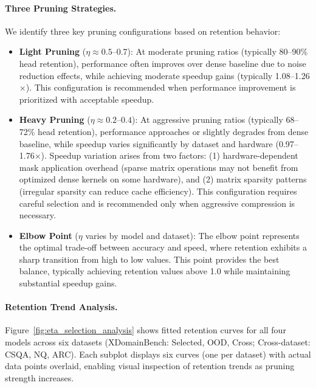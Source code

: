 \paragraph{Three Pruning Strategies.}
We identify three key pruning configurations based on retention behavior:

\begin{itemize}
    \item \textbf{Light Pruning} ($\eta \approx 0.5$--$0.7$): At moderate pruning ratios (typically 80--90\% head retention), performance often improves over dense baseline due to noise reduction effects, while achieving moderate speedup gains (typically 1.08--1.26$\times$). This configuration is recommended when performance improvement is prioritized with acceptable speedup.
    
    \item \textbf{Heavy Pruning} ($\eta \approx 0.2$--$0.4$): At aggressive pruning ratios (typically 68--72\% head retention), performance approaches or slightly degrades from dense baseline, while speedup varies significantly by dataset and hardware (0.97--1.76$\times$). Speedup variation arises from two factors: (1) hardware-dependent mask application overhead (sparse matrix operations may not benefit from optimized dense kernels on some hardware), and (2) matrix sparsity patterns (irregular sparsity can reduce cache efficiency). This configuration requires careful selection and is recommended only when aggressive compression is necessary.
    
    \item \textbf{Elbow Point} ($\eta$ varies by model and dataset): The elbow point represents the optimal trade-off between accuracy and speed, where retention exhibits a sharp transition from high to low values. This point provides the best balance, typically achieving retention values above 1.0 while maintaining substantial speedup gains.
\end{itemize}

\paragraph{Retention Trend Analysis.}
Figure~\ref{fig:eta_selection_analysis} shows fitted retention curves for all four models across six datasets (XDomainBench: Selected, OOD, Cross; Cross-dataset: CSQA, NQ, ARC).
Each subplot displays six curves (one per dataset) with actual data points overlaid, enabling visual inspection of retention trends as pruning strength increases.

